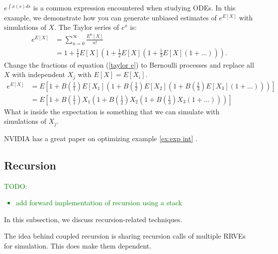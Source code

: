 \documentclass[a4paper,12pt]{article}
\begin{document}
\begin{example}[$e^{E[X]}$] \label{ex:exp int}
    $e^{\int x(s)ds}$ is a common expression encountered when studying ODEs.
    In this example, we demonstrate how you can generate unbiased estimates of
    $e^{E[X]}$ with simulations of $X$. The Taylor series of $e^{x}$ is:
    \begin{align}
        e^{E[X]} & = \sum_{n=0}^{\infty} \frac{E^{n}[X]}{n!}     \\
                 & = 1 + \frac{1}{1}E[X]\left(1+ \frac{1}{2}E[X]
        \left(1+\frac{1}{3}E[X]\left(1+ ...\right)\right)\right). \label{taylor e}
    \end{align}
    Change the fractions of equation (\ref{taylor e}) to Bernoulli processes
    and replace all $X$ with independent $X_j$ with $E[X]=E[X_{i}]$.
    \begin{align}
        e^{E[X]} & = E
        \left[1 + B\left(\frac{1}{1}\right)E[X_1]
        \left(1+ B\left(\frac{1}{2}\right)E[X_2]
        \left(1+B\left(\frac{1}{3}\right)E[X_3]
        \left(1+ ...\right)
        \right)
        \right)
        \right]              \\
                 & = E\left[
            1 + B\left(\frac{1}{1}\right)X_1
            \left(1+ B\left(\frac{1}{2}\right)X_2
            \left(1+B\left(\frac{1}{3}\right)X_3
            \left(1+ ...\right)
            \right)
            \right)
            \right]
    \end{align}
    What is inside the expectation is something that we can simulate with simulations of $X_{j}$.
\end{example}

\begin{related}
    NVIDIA has a great paper on optimizing example \ref{ex:exp int}
    \cite{kettunen_unbiased_2021}.
\end{related}

\subsection{Recursion}
\textcolor{green}{
    TODO:
    \begin{itemize}
        \item add forward implementation of recursion using a stack
    \end{itemize}
}
In this subsection, we discuss recursion-related techniques.

\begin{technique}
    The idea behind coupled recursion is sharing recursion calls of
    multiple RRVEs for simulation. This does make them dependent.
\end{technique}
\end{document}
